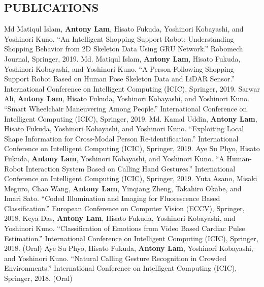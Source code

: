 \documentclass[letterpaper,10pt]{article}
\begin{document}
\subsection*{PUBLICATIONS}
Md Matiqul Islam, \textbf{Antony Lam}, Hisato Fukuda, Yoshinori Kobayashi, and Yoshinori Kuno. ``An Intelligent Shopping Support Robot: Understanding Shopping Behavior from 2D Skeleton Data Using GRU Network.'' Robomech Journal, Springer, 2019.\vspace{0.05in}\newline
Md. Matiqul Islam, \textbf{Antony Lam}, Hisato Fukuda, Yoshinori Kobayashi, and Yoshinori Kuno. ``A Person-Following Shopping Support Robot Based on Human Pose Skeleton Data and LiDAR Sensor.'' International Conference on Intelligent Computing (ICIC), Springer, 2019.\vspace{0.05in}\newline
Sarwar Ali, \textbf{Antony Lam}, Hisato Fukuda, Yoshinori Kobayashi, and Yoshinori Kuno. ``Smart Wheelchair Maneuvering Among People.'' International Conference on Intelligent Computing (ICIC), Springer, 2019.\vspace{0.05in}\newline
Md. Kamal Uddin, \textbf{Antony Lam}, Hisato Fukuda, Yoshinori Kobayashi, and Yoshinori Kuno. ``Exploiting Local Shape Information for Cross-Modal Person Re-identification.'' International Conference on Intelligent Computing (ICIC), Springer, 2019.\vspace{0.05in}\newline
Aye Su Phyo, Hisato Fukuda, \textbf{Antony Lam}, Yoshinori Kobayashi, and Yoshinori Kuno. ``A Human-Robot Interaction System Based on Calling Hand Gestures.'' International Conference on Intelligent Computing (ICIC), Springer, 2019.\vspace{0.05in}\newline
Yuta Asano, Misaki Meguro, Chao Wang, \textbf{Antony Lam}, Yinqiang Zheng, Takahiro Okabe, and Imari Sato. ``Coded Illumination and Imaging for Fluorescence Based Classification.'' European Conference on Computer Vision (ECCV), Springer, 2018.\vspace{0.05in}\newline
Keya Das, \textbf{Antony Lam}, Hisato Fukuda, Yoshinori Kobayashi, and Yoshinori Kuno. ``Classification of Emotions from Video Based Cardiac Pulse Estimation.'' International Conference on Intelligent Computing (ICIC), Springer, 2018. (Oral)\vspace{0.05in}\newline
Aye Su Phyo, Hisato Fukuda, \textbf{Antony Lam}, Yoshinori Kobayashi, and Yoshinori Kuno. ``Natural Calling Gesture Recognition in Crowded Environments.'' International Conference on Intelligent Computing (ICIC), Springer, 2018. (Oral)\vspace{0.05in}\newline
\end{document}

